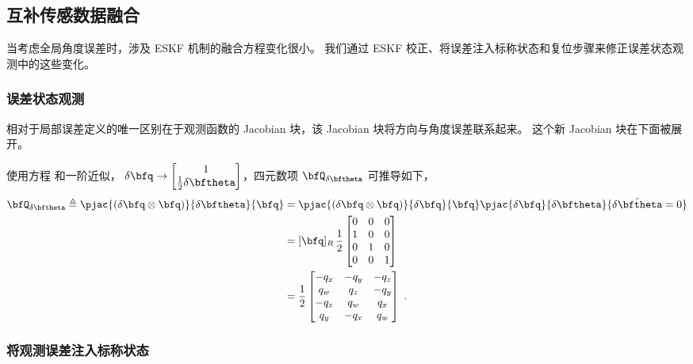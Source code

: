 \subsection{互补传感数据融合}

当考虑全局角度误差时，涉及 ESKF 机制的融合方程变化很小。 
我们通过 ESKF 校正、将误差注入标称状态和复位步骤来修正误差状态观测中的这些变化。

\subsubsection{误差状态观测}

相对于局部误差定义的唯一区别在于观测函数的 Jacobian 块，该 Jacobian 块将方向与角度误差联系起来。 
这个新 Jacobian 块在下面被展开。

使用方程  和一阶近似， $\delta\bfq\rightarrow \begin{bmatrix}
1 \\ \frac12\delta\bftheta
\end{bmatrix}$，四元数项 $\bfQ_{\delta\bftheta}$ 可推导如下，
%
\begin{subequations}
\begin{align}
\bfQ_{\delta\bftheta} \triangleq \pjac{(\delta\bfq\otimes\bfq)}{\delta\bftheta}{\bfq} 
&=\pjac{(\delta\bfq\otimes\bfq)}{\delta\bfq}{\bfq} \pjac{\delta\bfq}{\delta\bftheta}{\hat{\delta\bftheta}=0} \\
&= [\bfq]_R\,\frac12\begin{bmatrix}
0 & 0 & 0 \\
1 & 0 & 0 \\
0 & 1 & 0 \\
0 & 0 & 1 \\
\end{bmatrix} \\
&= \frac{1}{2}\begin{bmatrix}
-q_x &-q_y &-q_z\\
 q_w & q_z &-q_y\\
-q_z & q_w & q_x\\
 q_y &-q_x & q_w\\
\end{bmatrix}~.
\end{align}
\end{subequations}


\subsubsection{将观测误差注入标称状态}

